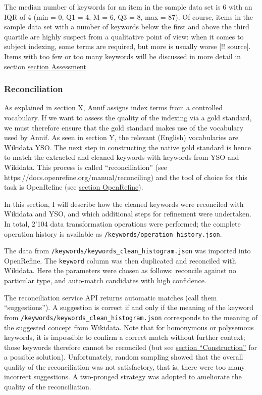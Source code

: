 The median number of keywords for an item in the sample data set is 6
with an IQR of 4 (min = 0, Q1 = 4, M = 6, Q3 = 8, max = 87). Of course,
items in the sample data set with a number of keywords below the first
and above the third quartile are highly suspect from a qualitative point
of view: when it comes to subject indexing, some terms are required, but
more is usually worse {[}!! source{]}. Items with too few or too many
keywords will be discussed in more detail in section
\protect\hyperlink{assessment}{section Assessment}

\hypertarget{reconciliation}{%
\subsubsection{Reconciliation}\label{reconciliation}}

As explained in section X, Annif assigns index terms from a controlled
vocabulary. If we want to assess the quality of the indexing via a gold
standard, we must therefore ensure that the gold standard makes use of
the vocabulary used by Annif. As seen in section Y, the relevant
(English) vocabularies are Wikidata YSO. The next step in constructing
the native gold standard is hence to match the extracted and cleaned
keywords with keywords from YSO and Wikidata. This process is called
``reconciliation'' (see https://docs.openrefine.org/manual/reconciling)
and the tool of choice for this task is OpenRefine (see
\protect\hyperlink{openrefine}{section OpenRefine}).

In this section, I will describe how the cleaned keywords were
reconciled with Wikidata and YSO, and which additional steps for
refinement were undertaken. In total, 2'104 data transformation
operations were performed; the complete operation history is available
as \texttt{/keywords/operation\_history.json}.

The data from \texttt{/keywords/keywords\_clean\_histogram.json} was
imported into OpenRefine. The \texttt{keyword} column was then
duplicated and reconciled with Wikidata. Here the parameters were chosen
as follows: reconcile against no particular type, and auto-match
candidates with high confidence.

The reconciliation service API returns automatic matches (call them
``suggestions''). A suggestion is correct if and only if the meaning of
the keyword from \texttt{/keywords/keywords\_clean\_histogram.json}
corresponds to the meaning of the suggested concept from Wikidata. Note
that for homonymous or polysemous keywords, it is impossible to confirm
a correct match without further context; those keywords therefore cannot
be reconciled (but see \protect\hyperlink{construction}{section
``Construction''} for a possible solution). Unfortunately, random
sampling showed that the overall quality of the reconciliation was not
satisfactory, that is, there were too many incorrect suggestions. A
two-pronged strategy was adopted to ameliorate the quality of the
reconciliation.

